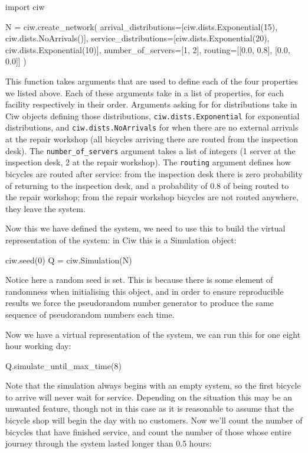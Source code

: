 \begin{pyin}
import ciw

N = ciw.create_network(
    arrival_distributions=[ciw.dists.Exponential(15), ciw.dists.NoArrivals()],
    service_distributions=[ciw.dists.Exponential(20), ciw.dists.Exponential(10)],
    number_of_servers=[1, 2],
    routing=[[0.0, 0.8], [0.0, 0.0]]
)
\end{pyin}

This function takes arguments that are used to define each of the four
properties we listed above. Each of these arguments take in a list of
properties, for each facility respectively in their order.
Arguments asking for for distributions take in Ciw objects defining those
distributions, \texttt{ciw.dists.Exponential} for exponential
distributions, and \texttt{ciw.dists.NoArrivals} for when there are
no external arrivals at the repair workshop (all bicycles arriving there are
routed from the inspection desk).
The \texttt{number_of_servers} argument takes a list of integers (1
server at the inspection desk, 2 at the repair workshop).
The \texttt{routing} argument defines how bicycles are routed after
service: from the inspection desk there is zero probability of returning to the
inspection desk, and a probability of 0.8 of being routed to the repair
workshop; from the repair workshop bicycles are not routed anywhere, they leave
the system.

Now this we have defined the system, we need to use this to build the virtual
representation of the system: in Ciw this is a Simulation object:

\begin{pyin}
ciw.seed(0)
Q = ciw.Simulation(N)
\end{pyin}

Notice here a random seed is set. This is because there is some element of
randomness when initialising this object, and in order to ensure reproducible
results we force the pseudorandom number generator to produce the same sequence
of pseudorandom numbers each time.

Now we have a virtual representation of the system, we can run this for one
eight hour working day:

\begin{pyin}
Q.simulate_until_max_time(8)
\end{pyin}

Note that the simulation always begins with an empty system, so the first
bicycle to arrive will never wait for service. Depending on the situation this
may be an unwanted feature, though not in this case as it is reasonable to
assume that the bicycle shop will begin the day with no customers.
Now we'll count the number of bicycles that have finished service, and count the
number of those whose entire journey through the system lasted longer than 0.5
hours:

